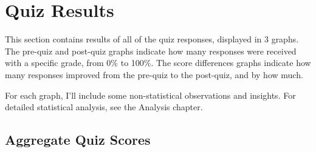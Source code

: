 	\clearpage

	\section{Quiz Results}
		This section contains results of all of the quiz responses, displayed in 3 graphs. The pre-quiz and post-quiz graphs indicate how many responses were received with a specific grade, from 0\% to 100\%. The score differences graphs indicate how many responses improved from the pre-quiz to the post-quiz, and by how much.

		For each graph, I'll include some non-statistical observations and insights. For detailed statistical analysis, see the Analysis chapter.

		\subsection{Aggregate Quiz Scores}

